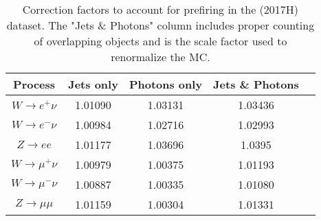 \begin{table}[htbp]
\begin{center}
\begin{tabular}{|c|c|c|c|c|}
\hline
Process & Jets only & Photons only & Jets \& Photons \\\hline \hline
$W\rightarrow e^+\nu$      & 1.01090 & 1.03131 & 1.03436 \\
$W\rightarrow e^-\nu$      & 1.00984 & 1.02716 & 1.02993\\
$Z\rightarrow ee$          & 1.01177 & 1.03696 & 1.0395 \\
\hline
$W\rightarrow \mu^+\nu$   & 1.00979 & 1.00375 & 1.01193 \\
$W\rightarrow \mu^-\nu$   & 1.00887 & 1.00335 & 1.01080 \\
$Z\rightarrow \mu\mu$     & 1.01159 & 1.00304 & 1.01331 \\
\hline
\end{tabular}
\end{center}

\caption{Correction factors to account for prefiring in the \sh (2017H) dataset. The "Jets \& Photons" column includes proper counting of overlapping objects and is the scale factor used to renormalize the MC.}
\label{tab:prefire:13}
\end{table}
